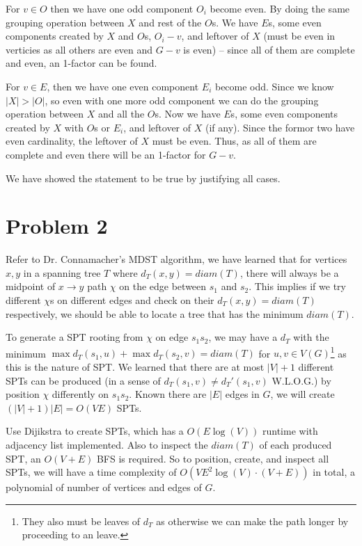 \documentclass[11pt]{article}
\begin{document}
For $v \in O$ then we have one odd component $O_i$ become even. By doing the same grouping operation between $X$ and rest of the $O$s. We have $E$s, some even components created by $X$ and $O$s, $O_i - v$, and leftover of $X$ (must be even in verticies as all others are even and $G-v$ is even) -- since all of them are complete and even, an 1-factor can be found.

For $v \in E$, then we have one even component $E_i$ become odd. Since we know $|X| > |O|$, so even with one more odd component we can do the grouping operation between $X$ and all the $O$s. Now we have $E$s, some even components created by $X$ with $O$s or $E_i$, and leftover of $X$ (if any). Since the formor two have even cardinality, the leftover of $X$ must be even. Thus, as all of them are complete and even there will be an 1-factor for $G-v$.\newline

We have showed the statement to be true by justifying all cases.




\section*{Problem 2}

Refer to Dr. Connamacher's MDST algorithm, we have learned that for vertices $x, y$ in a spanning tree $T$ where $d_T(x, y) = diam(T)$, there will always be a midpoint of $x \to y$ path $\chi$ on the edge between $s_1$ and $s_2$. This implies if we try different $\chi$s on different edges and check on their $d_T(x, y) = diam(T)$ respectively, we should be able to locate a tree that has the minimum $diam(T)$.\newline

To generate a SPT rooting from $\chi$ on edge $s_1 s_2$, we may have a $d_T$ with the minimum $\max d_T(s_1, u) + \max d_T(s_2, v) = diam(T)$ for $u, v \in V(G)$\footnote{They also must be leaves of $d_T$ as otherwise we can make the path longer by proceeding to an leave.} as this is the nature of SPT. We learned that there are at most $|V| + 1$ different SPTs can be produced (in a sense of $d_T(s_1, v) \neq d_T'(s_1, v)$ W.L.O.G.) by position $\chi$ differently on $s_1 s_2$. Known there are $|E|$ edges in $G$, we will create $(|V| + 1)|E| = O(VE)$ SPTs.

Use Dijikstra to create SPTs, which has a $O(E \log(V))$ runtime with adjacency list implemented. Also to inspect the $diam(T)$ of each produced SPT, an $O(V + E)$ BFS is required. So to position, create, and inspect all SPTs, we will have a time complexity of $O(V E^2 \log(V) \cdot (V+E))$ in total, a polynomial of number of vertices and edges of $G$.
\end{document}
